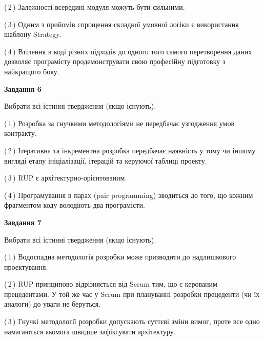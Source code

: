 \documentclass[10pt, ukrainian]{article}
\begin{document}
{\begin {large}
(\,2\,) Залежності всередині модуля можуть бути сильними. %



(\,3\,) Одним з прийомів спрощення складної умовної логіки є використання шаблону Strategy. %



(\,4\,) Втілення в коді різних підходів до одного того самого перетворення даних дозволяє програмісту продемонструвати свою професійну підготовку з найкращого боку. %

\newpage

{\begin {center}\textbf{Завдання 6}\end {center}}\par
Вибрати всі істинні твердження (якщо існують).\par
\vspace{2mm}



(\,1\,) Розробка за гнучкими методологіями не передбачає узгодження умов контракту. %



(\,2\,) Ітеративна та інкрементна розробка передбачає наявність у тому чи іншому вигляді етапу ініціалізації, ітерацій та керуючої таблиці проекту. %



(\,3\,) RUP є архітектурно-орієнтованим. %



(\,4\,) Програмування в парах (pair programming) зводиться до того, що кожним фрагментом коду володіють два програмісти. %


{\begin {center}\textbf{Завдання 7}\end {center}}\par
Вибрати всі істинні твердження (якщо існують).\par
\vspace{2mm}



(\,1\,) Водоспадна методологія розробки може призводити до надлишкового проектування. %



(\,2\,) RUP принципово відрізняється від Scrum тим, що є керованим прецедентами. У той же час у Scrum при плануванні розробки прецеденти (чи їх аналоги) до уваги не беруться. %



(\,3\,) Гнучкі методології розробки допускають суттєві зміни вимог, проте все одно намагаються якомога швидше зафіксувати архітектуру. %




\end{large}}
\end{document}
